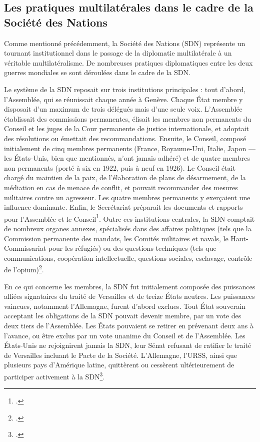 \documentclass[a4paper,twoside,12pt]{book}
\begin{document}
\subsection{Les pratiques multilatérales dans le cadre de la Société des Nations}

Comme mentionné précédemment, la Société des Nations (SDN) représente un tournant institutionnel dans le passage de la diplomatie multilatérale à un véritable multilatéralisme. De nombreuses pratiques diplomatiques entre les deux guerres mondiales se sont déroulées dans le cadre de la SDN.

Le système de la SDN reposait sur trois institutions principales : tout d'abord, l'Assemblée, qui se réunissait chaque année à Genève. Chaque État membre y disposait d'un maximum de trois délégués mais d'une seule voix. L'Assemblée établissait des commissions permanentes, élisait les membres non permanents du Conseil et les juges de la Cour permanente de justice internationale, et adoptait des résolutions ou émettait des recommandations. Ensuite, le Conseil, composé initialement de cinq membres permanents (France, Royaume-Uni, Italie, Japon — les États-Unis, bien que mentionnés, n'ont jamais adhéré) et de quatre membres non permanents (porté à six en 1922, puis à neuf en 1926). Le Conseil était chargé du maintien de la paix, de l'élaboration de plans de désarmement, de la médiation en cas de menace de conflit, et pouvait recommander des mesures militaires contre un agresseur. Les quatre membres permanents y exerçaient une influence dominante. Enfin, le Secrétariat préparait les documents et rapports pour l'Assemblée et le Conseil\footcite[p.37-38]{milza2019}. Outre ces institutions centrales, la SDN comptait de nombreux organes annexes, spécialisés dans des affaires politiques (tels que la Commission permanente des mandats, les Comités militaires et navals, le Haut-Commissariat pour les réfugiés) ou des questions techniques (tels que communications, coopération intellectuelle, questions sociales, esclavage, contrôle de l'opium)\footcite[p.39]{milza2019}.

En ce qui concerne les membres, la SDN fut initialement composée des puissances alliées signataires du traité de Versailles et de treize États neutres. Les puissances vaincues, notamment l'Allemagne, furent d'abord exclues. Tout État souverain acceptant les obligations de la SDN pouvait devenir membre, par un vote des deux tiers de l'Assemblée. Les États pouvaient se retirer en prévenant deux ans à l'avance, ou être exclus par un vote unanime du Conseil et de l'Assemblée. Les États-Unis ne rejoignirent jamais la SDN, leur Sénat refusant de ratifier le traité de Versailles incluant le Pacte de la Société. L'Allemagne, l'URSS, ainsi que plusieurs pays d'Amérique latine, quittèrent ou cessèrent ultérieurement de participer activement à la SDN\footcite[p.36-37]{milza2019}.
\end{document}
